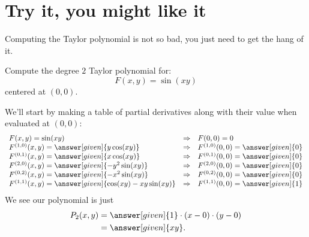 \documentclass{ximera}
\begin{document}
\section{Try it, you might like it}

Computing the Taylor polynomial is not so bad, you just need to get the hang of it. 

\begin{example}
  Compute the degree $2$ Taylor polynomial for:
  \[
  F(x,y)=\sin(xy)
  \]
  centered at $(0,0)$.
  \begin{explanation}
    We'll start by making a table of partial derivatives along with
    their value when evaluated at $(0,0)$:
    \[
    \begin{array}{lcl}
      F(x,y) = \sin(xy) & \Rightarrow &F(0,0) = 0\\
      F^{(1,0)}(x,y) = \answer[given]{y\cos(xy)} & \Rightarrow & F^{(1,0)}(0,0) = \answer[given]{0}\\
      F^{(0,1)}(x,y) = \answer[given]{x\cos(xy)} &\Rightarrow  & F^{(0,1)}(0,0) = \answer[given]{0}\\
      F^{(2,0)}(x,y) = \answer[given]{-y^2\sin(xy)} &\Rightarrow & F^{(2,0)}(0,0) = \answer[given]{0}\\
      F^{(0,2)}(x,y) = \answer[given]{-x^2\sin(xy)} &\Rightarrow & F^{(0,2)}(0,0) = \answer[given]{0}\\
      F^{(1,1)}(x,y) = \answer[given]{\cos(xy)-xy\sin(xy)} &\Rightarrow & F^{(1,1)}(0,0) = \answer[given]{1}
    \end{array}
    \]
    We see our polynomial is just
    \begin{align*}
      P_2(x,y) &= \answer[given]{1}\cdot (x-0)\cdot (y-0)\\
      &= \answer[given]{xy}.
    \end{align*}
  \end{explanation}
\end{example}
\end{document}
